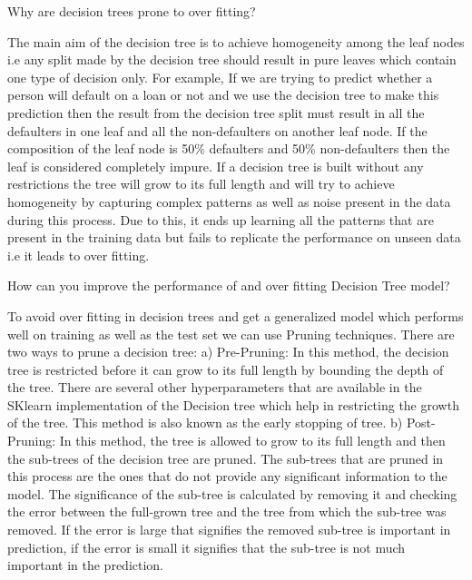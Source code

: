 	\begin{qanda}
		\begin{question}
Why are decision trees prone to over fitting?
		\end{question}
		\begin{answer}
The main aim of the decision tree is to achieve homogeneity among the leaf nodes i.e any split made by the decision tree should result in pure leaves which contain one type of decision only. For example, If we are trying to predict whether a person will default on a loan or not and we use the decision tree to make this prediction then the result from the decision tree split must result in all the defaulters in one leaf and all the non-defaulters on another leaf node. If the composition of the leaf node is 50\% defaulters and 50\% non-defaulters then the leaf is considered completely impure. If a decision tree is built without any restrictions the tree will grow to its full length and will try to achieve homogeneity by capturing complex patterns as well as noise present in the data during this process. Due to this, it ends up learning all the patterns that are present in the training data but fails to replicate the performance on unseen data i.e it leads to over fitting.
		\end{answer}
	\end{qanda}

	\begin{qanda}
		\begin{question}
How can you improve the performance of and over fitting Decision Tree model?
		\end{question}
		\begin{answer}
To avoid over fitting in decision trees and get a generalized model which performs well on training as well as the test set we can use Pruning techniques. There are two ways to prune a decision tree: a) Pre-Pruning: In this method, the decision tree is restricted before it can grow to its full length by bounding the depth of the tree. There are several other hyperparameters that are available in the SKlearn implementation of the Decision tree which help in restricting the growth of the tree. This method is also known as the early stopping of tree. b) Post-Pruning: In this method, the tree is allowed to grow to its full length and then the sub-trees of the decision tree are pruned. The sub-trees that are pruned in this process are the ones that do not provide any significant information to the model. The significance of the sub-tree is calculated by removing it and checking the error between the full-grown tree and the tree from which the sub-tree was removed. If the error is large that signifies the removed sub-tree is important in prediction, if the error is small it signifies that the sub-tree is not much important in the prediction.
		\end{answer}
	\end{qanda}

